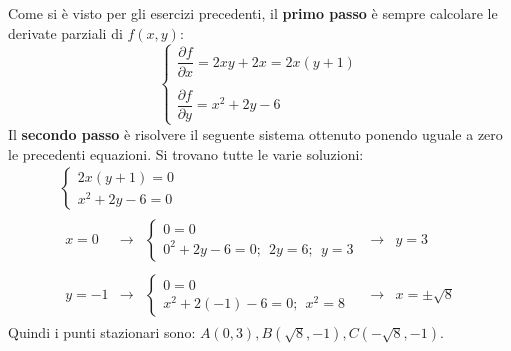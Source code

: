 \documentclass[a4paper]{article}
\begin{document}
	\noindent
	Come si è visto per gli esercizi precedenti, il \textbf{primo passo} è sempre calcolare le derivate parziali di $f\left(x,y\right)$:
	\begin{equation*}
		\begin{cases}
			\dfrac{\partial f}{\partial x} = 2xy + 2x = 2x\left(y + 1\right) \\
			\\
			\dfrac{\partial f}{\partial y} = x^{2} + 2y - 6
		\end{cases}
	\end{equation*}
	Il \textbf{secondo passo} è risolvere il seguente sistema ottenuto ponendo uguale a zero le precedenti equazioni. Si trovano tutte le varie soluzioni:
	\begin{gather*}
		\begin{cases}
			2x\left(y + 1\right) = 0 \\
			x^{2} + 2y - 6 = 0
		\end{cases} \\
		\begin{array}{rclcl}
			x = 0	&\rightarrow& \begin{cases}
				0 = 0 \\
				0^{2} + 2y - 6 = 0; \:\: 2y = 6; \:\: y = 3
			\end{cases} &\rightarrow& y = 3 \\
			\\
			y = -1	&\rightarrow& \begin{cases}
				0 = 0 \\
				x^{2} + 2\left(-1\right) - 6 = 0; \:\: x^{2} = 8
			\end{cases} &\rightarrow& x = \pm\sqrt{8}
		\end{array}
	\end{gather*}
	Quindi i punti stazionari sono: $A\left(0,3\right), B\left(\sqrt{8}, -1\right), C\left(-\sqrt{8}, -1\right)$.\newline
\end{document}
